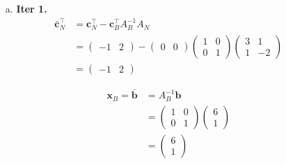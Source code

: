\documentclass[11pt]{article}
\theoremstyle{remark}
\newcommand{\bx}{\mathbf{x}}
\newcommand{\bc}{\mathbf{c}}
\begin{document}
\color{blue}
\begin{itemize}
    \item[a.] 
    \textbf{Iter 1.}
    \begin{align*}
    \bar{\bc}_N^\intercal&=\bc^\intercal_N-\bc^\intercal_B A_B^{-1} A_N &\\
    &= 
\begin{pmatrix}
-1 & 2
\end{pmatrix} -
\begin{pmatrix}
0 & 0
\end{pmatrix}
\begin{pmatrix}
1 & 0 \\
0 & 1
\end{pmatrix}
\begin{pmatrix}
3 & 1 \\
1 & -2
\end{pmatrix} &\\
&= \begin{pmatrix}
-1 & 2
\end{pmatrix}
    \end{align*}
    
 \begin{align*}
\bx_B=\bar{\textbf{b}} &= A_B^{-1}\textbf{b} &\\
&= \begin{pmatrix}
1 & 0 \\
0 & 1
\end{pmatrix}
\begin{pmatrix}
6 \\ 1
\end{pmatrix} &\\
&= \begin{pmatrix}
6 \\ 1
\end{pmatrix}
 \end{align*}


\end{itemize}
\end{document}
